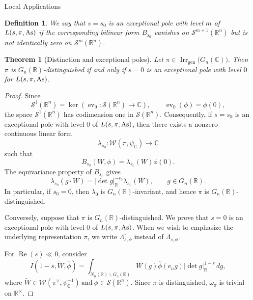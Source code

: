 \documentclass[12pt,reqno]{amsart}
\numberwithin{equation}{section}%
\numberwithin{equation}{subsection}
\newtheorem{thm}[equation]{Theorem}%
\newtheorem{defn}[equation]{Definition}
\theoremstyle{definition}
\theoremstyle{remark}
\begin{document}
\begin{section}{Local Applications}
\begin{defn}
We say that \(s=s_0\) is an \emph{exceptional pole with level \(m\)} of
\(L(s,\pi,{\rm As})\) if the corresponding bilinear form \(B_{s_0}\) vanishes
on $\mathcal{S}^{m+1}(\mathbb{R}^{n})$
but is not identically zero on $\mathcal{S}^{m}(\mathbb{R}^{n})$.
\end{defn}

\begin{thm}[Distinction and exceptional poles]\label{thm:distinguished-exceptional}
Let $
\pi\in\operatorname{Irr}_{\mathrm{gen}}
\bigl(G_n(\mathbb{C})\bigr).
$
Then \(\pi\) is \(G_n(\mathbb{R})\)-distinguished if and only if
\(s=0\) is an exceptional pole with level $0$ for \(L(s,\pi,{\rm As})\).
\end{thm}

\begin{proof}
Since
\[
\mathcal{S}^{1}(\mathbb{R}^{n})
=
\ker\!\left(
\operatorname{ev}_{0}:
\mathcal{S}(\mathbb{R}^{n})\longrightarrow\mathbb{C}
\right),
\qquad
\operatorname{ev}_{0}(\phi)=\phi(0),
\]
the space \(\mathcal{S}^{1}(\mathbb{R}^{n})\) has codimension one in
\(\mathcal{S}(\mathbb{R}^{n})\). Consequently, if \(s=s_{0}\) is an
exceptional pole with level \(0\) of \(L(s,\pi,{\rm As})\), then there exists a
nonzero continuous linear form
\[
\lambda_{s_{0}}:
\mathcal{W}(\pi,\psi_{\mathbb{C}})
\longrightarrow
\mathbb{C}
\]
such that
\[
B_{s_{0}}(W,\phi)
=
\lambda_{s_{0}}(W)\phi(0).
\]
The equivariance property of \(B_{s_{0}}\) gives
\[
\lambda_{s_{0}}(g\cdot W)
=
|\det g|_{\mathbb{R}}^{-s_{0}}
\lambda_{s_{0}}(W),
\qquad
g\in G_n(\mathbb{R}).
\]
In particular, if \(s_{0}=0\), then \(\lambda_{0}\) is
\(G_n(\mathbb{R})\)-invariant, and hence \(\pi\) is
\(G_n(\mathbb{R})\)-distinguished.

Conversely, suppose that \(\pi\) is \(G_n(\mathbb{R})\)-distinguished.
We prove that \(s=0\) is an exceptional pole with level \(0\) of
\(L(s,\pi,{\rm As})\). When we wish to emphasize the underlying representation \(\pi\), we write
\(\Lambda_{s,\phi}^{\pi}\) instead of \(\Lambda_{s,\phi}\).

For \(\operatorname{Re}(s)\ll 0\), consider
\[
I(1-s,\widetilde{W},\widehat{\phi})
=
\int_{N_n(\mathbb{R})\backslash G_n(\mathbb{R})}
\widetilde{W}(g)\widehat{\phi}(e_ng)
|\det g|_{\mathbb{R}}^{1-s}\,dg,
\]
where
$\widetilde{W}
\in
\mathcal{W}({\pi}^\vee,\psi_{\mathbb{C}}^{-1})
\>\text{and}\>
\phi\in\mathcal{S}(\mathbb{R}^{n}).$ Since \(\pi\) is distinguished, $\omega_\pi$ is trivial on
\(\mathbb{R}^{\times}\).


\end{proof}
\end{section}
\end{document}
